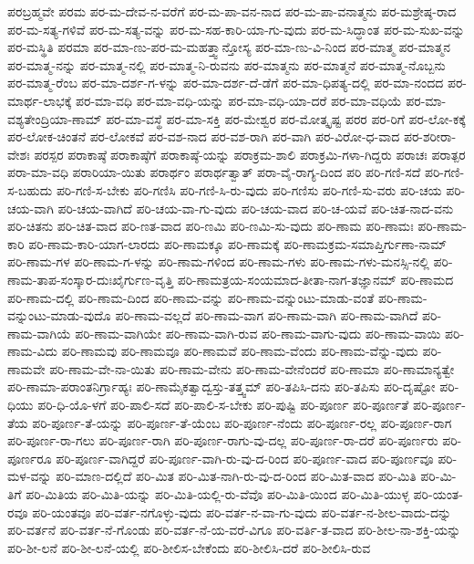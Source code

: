 {ಪರಬ್ರಹ್ಮವೇ
ಪರಮ
ಪರ-ಮ-ದೇವ-ನ-ವರೆಗೆ
ಪರ-ಮ-ಪಾ-ವನ-ನಾದ
ಪರ-ಮ-ಪಾ-ವನಾತ್ಮನು
ಪರ-ಮಶ್ರೇಷ್ಠ-ರಾದ
ಪರ-ಮ-ಸತ್ಯ-ಗಳಿವೆ
ಪರ-ಮ-ಸತ್ಯ-ವನ್ನು
ಪರ-ಮ-ಸಹ-ಕಾರಿ-ಯಾ-ಗು-ವುದು
ಪರ-ಮ-ಸಿದ್ಧಾಂತ
ಪರ-ಮ-ಸುಖ-ವನ್ನು
ಪರ-ಮಸ್ಥಿತಿ
ಪರಮಾ
ಪರ-ಮಾ-ಣು-ಪರ-ಮ-ಮಹತ್ತ್ವಾನ್ತೋಸ್ಯ
ಪರ-ಮಾ-ಣು-ವಿ-ನಿಂದ
ಪರ-ಮಾತ್ಮ
ಪರ-ಮಾತ್ಮನ
ಪರ-ಮಾತ್ಮ-ನನ್ನು
ಪರ-ಮಾತ್ಮ-ನಲ್ಲಿ
ಪರ-ಮಾತ್ಮ-ನಿ-ರುವನು
ಪರ-ಮಾತ್ಮನು
ಪರ-ಮಾತ್ಮನೆ
ಪರ-ಮಾತ್ಮ-ನೊಬ್ಬನು
ಪರ-ಮಾತ್ಮ-ರೆಂಬ
ಪರ-ಮಾ-ದರ್ಶ-ಗ-ಳನ್ನು
ಪರ-ಮಾ-ದರ್ಶ-ದೆ-ಡೆಗೆ
ಪರ-ಮಾ-ಧಿಪತ್ಯ-ದಲ್ಲಿ
ಪರ-ಮಾ-ನಂದದ
ಪರ-ಮಾರ್ಥ-ಲಾಭಕ್ಕೆ
ಪರ-ಮಾ-ವಧಿ
ಪರ-ಮಾ-ವಧಿ-ಯನ್ನು
ಪರ-ಮಾ-ವಧಿ-ಯಾ-ದರೆ
ಪರ-ಮಾ-ವಧಿಯೆ
ಪರ-ಮಾ-ವಶ್ಯತೇಂದ್ರಿಯಾ-ಣಾಮ್
ಪರ-ಮಾ-ವಸ್ಥೆ
ಪರ-ಮಾ-ಸಕ್ತಿ
ಪರ-ಮೇಶ್ವರ
ಪರ-ಮೋತ್ಕೃಷ್ಟ
ಪರರ
ಪರ-ರಿಗೆ
ಪರ-ಲೋ-ಕಕ್ಕೆ
ಪರ-ಲೋಕ-ಚಿಂತನೆ
ಪರ-ಲೋಕವೆ
ಪರ-ವಶ-ನಾದ
ಪರ-ವಶ-ರಾಗಿ
ಪರ-ವಾಗಿ
ಪರ-ವಿರೋ-ಧ-ವಾದ
ಪರ-ಶರೀರಾ-ವೇಶಃ
ಪರಸ್ಪರ
ಪರಾಕಾಷ್ಠೆ
ಪರಾಕಾಷ್ಠೆಗೆ
ಪರಾಕಾಷ್ಠೆ-ಯನ್ನು
ಪರಾಕ್ರಮ-ಶಾಲಿ
ಪರಾಕ್ರಮಿ-ಗಳಾ-ಗಿದ್ದರು
ಪರಾಚಃ
ಪರಾತ್ಪರ
ಪರಾ-ಮಾ-ವಧಿ
ಪರಾರಿಯಾ-ಯಿತು
ಪರಾರ್ಥಂ
ಪರಾರ್ಥತ್ವಾತ್
ಪರಾ-ವೈ-ರಾಗ್ಯ-ದಿಂದ
ಪರಿ
ಪರಿ-ಗಣಿ-ಸದೆ
ಪರಿ-ಗಣಿ-ಸ-ಬಹುದು
ಪರಿ-ಗಣಿ-ಸ-ಬೇಕು
ಪರಿ-ಗಣಿಸಿ
ಪರಿ-ಗಣಿ-ಸಿ-ರು-ವುದು
ಪರಿ-ಗಣಿಸು
ಪರಿ-ಗಣಿ-ಸು-ವರು
ಪರಿ-ಚಯ
ಪರಿ-ಚಯ-ವಾಗಿ
ಪರಿ-ಚಯ-ವಾಗಿದೆ
ಪರಿ-ಚಯ-ವಾ-ಗು-ವುದು
ಪರಿ-ಚಯ-ವಾದ
ಪರಿ-ಚ-ಯವೆ
ಪರಿ-ಚಿತ-ನಾದ-ವನು
ಪರಿ-ಚಿತನು
ಪರಿ-ಚಿತ-ವಾದ
ಪರಿ-ಣತ-ವಾದ
ಪರಿ-ಣಮಿ
ಪರಿ-ಣಮಿ-ಸು-ವುದು
ಪರಿ-ಣಾಮ
ಪರಿ-ಣಾಮಃ
ಪರಿ-ಣಾಮ-ಕಾರಿ
ಪರಿ-ಣಾಮ-ಕಾರಿ-ಯಾಗ-ಲಾರದು
ಪರಿ-ಣಾಮಕ್ಕೂ
ಪರಿ-ಣಾಮಕ್ಕೆ
ಪರಿ-ಣಾಮಕ್ರಮ-ಸಮಾಪ್ತಿರ್ಗುಣಾ-ನಾಮ್
ಪರಿ-ಣಾಮ-ಗಳ
ಪರಿ-ಣಾಮ-ಗ-ಳನ್ನು
ಪರಿ-ಣಾಮ-ಗಳಿಂದ
ಪರಿ-ಣಾಮ-ಗಳು
ಪರಿ-ಣಾಮ-ಗಳು-ಮನಸ್ಸಿ-ನಲ್ಲಿ
ಪರಿ-ಣಾಮ-ತಾಪ-ಸಂಸ್ಕಾರ-ದುಃಖೈರ್ಗುಣ-ವೃತ್ತಿ
ಪರಿ-ಣಾಮತ್ರಯ-ಸಂಯಮಾದ-ತೀತಾ-ನಾಗ-ತಜ್ಞಾನಮ್
ಪರಿ-ಣಾಮದ
ಪರಿ-ಣಾಮ-ದಲ್ಲಿ
ಪರಿ-ಣಾಮ-ದಿಂದ
ಪರಿ-ಣಾಮ-ವನ್ನು
ಪರಿ-ಣಾಮ-ವನ್ನುಂಟು-ಮಾಡು-ವಂತೆ
ಪರಿ-ಣಾಮ-ವನ್ನುಂಟು-ಮಾಡು-ವುದೊ
ಪರಿ-ಣಾಮ-ವಲ್ಲದೆ
ಪರಿ-ಣಾಮ-ವಾಗ
ಪರಿ-ಣಾಮ-ವಾಗಿ
ಪರಿ-ಣಾಮ-ವಾಗಿದೆ
ಪರಿ-ಣಾಮ-ವಾಗಿಯೆ
ಪರಿ-ಣಾಮ-ವಾಗಿಯೇ
ಪರಿ-ಣಾಮ-ವಾಗಿ-ರುವ
ಪರಿ-ಣಾಮ-ವಾಗು-ವುದು
ಪರಿ-ಣಾಮ-ವಾಯಿ
ಪರಿ-ಣಾಮ-ವಿದು
ಪರಿ-ಣಾಮವು
ಪರಿ-ಣಾಮವೂ
ಪರಿ-ಣಾಮವೆ
ಪರಿ-ಣಾಮ-ವೆಂದು
ಪರಿ-ಣಾಮ-ವೆನ್ನು-ವುದು
ಪರಿ-ಣಾಮವೇ
ಪರಿ-ಣಾಮ-ವೇ-ನಾ-ಯಿತು
ಪರಿ-ಣಾಮ-ವೇನು
ಪರಿ-ಣಾಮ-ವೇನೆಂದರೆ
ಪರಿ-ಣಾಮಾ
ಪರಿ-ಣಾಮಾನ್ಯತ್ವೇ
ಪರಿ-ಣಾಮಾ-ಪರಾಂತನಿರ್ಗ್ರಾಹ್ಯಃ
ಪರಿ-ಣಾಮೈಕತ್ವಾದ್ವಸ್ತು-ತತ್ತ್ವಮ್
ಪರಿ-ತಪಿಸಿ-ದನು
ಪರಿ-ತಪಿಸು
ಪರಿ-ದೃಷ್ಟೋ
ಪರಿ-ಧಿಯು
ಪರಿ-ಧಿ-ಯೊ-ಳಗೆ
ಪರಿ-ಪಾಲಿ-ಸದೆ
ಪರಿ-ಪಾಲಿ-ಸ-ಬೇಕು
ಪರಿ-ಪುಷ್ಟಿ
ಪರಿ-ಪೂರ್ಣ
ಪರಿ-ಪೂರ್ಣತೆ
ಪರಿ-ಪೂರ್ಣ-ತೆಯ
ಪರಿ-ಪೂರ್ಣ-ತೆ-ಯನ್ನು
ಪರಿ-ಪೂರ್ಣ-ತೆ-ಯೆಂಬ
ಪರಿ-ಪೂರ್ಣ-ನೆಂದು
ಪರಿ-ಪೂರ್ಣ-ರಲ್ಲ
ಪರಿ-ಪೂರ್ಣ-ರಾಗ
ಪರಿ-ಪೂರ್ಣ-ರಾ-ಗಲು
ಪರಿ-ಪೂರ್ಣ-ರಾಗಿ
ಪರಿ-ಪೂರ್ಣ-ರಾಗು-ವು-ದಲ್ಲ
ಪರಿ-ಪೂರ್ಣ-ರಾ-ದರೆ
ಪರಿ-ಪೂರ್ಣರು
ಪರಿ-ಪೂರ್ಣರೂ
ಪರಿ-ಪೂರ್ಣ-ವಾಗಿದ್ದರೆ
ಪರಿ-ಪೂರ್ಣ-ವಾಗಿ-ರು-ವು-ದ-ರಿಂದ
ಪರಿ-ಪೂರ್ಣ-ವಾದ
ಪರಿ-ಪೂರ್ಣವೂ
ಪರಿ-ಮಳ-ವನ್ನು
ಪರಿ-ಮಾಣ-ದಲ್ಲಿದೆ
ಪರಿ-ಮಿತ
ಪರಿ-ಮಿತ-ನಾಗಿ-ರು-ವು-ದ-ರಿಂದ
ಪರಿ-ಮಿತ-ವಾದ
ಪರಿ-ಮಿತಿ
ಪರಿ-ಮಿ-ತಿಗೆ
ಪರಿ-ಮಿತಿಯ
ಪರಿ-ಮಿತಿ-ಯನ್ನು
ಪರಿ-ಮಿತಿ-ಯಲ್ಲಿ-ರು-ವೆವೊ
ಪರಿ-ಮಿತಿ-ಯಿಂದ
ಪರಿ-ಮಿತಿ-ಯುಳ್ಳ
ಪರಿ-ಯಂತ-ರವೂ
ಪರಿ-ಯಂತವೂ
ಪರಿ-ವರ್ತ-ನಗೊಳ್ಳು-ವುದು
ಪರಿ-ವರ್ತ-ನ-ವಾ-ಗು-ವುದು
ಪರಿ-ವರ್ತ-ನ-ಶೀಲ-ವಾದು-ದನ್ನು
ಪರಿ-ವರ್ತನೆ
ಪರಿ-ವರ್ತ-ನೆ-ಗೊಂಡು
ಪರಿ-ವರ್ತ-ನೆ-ಯ-ವರೆ-ವಿಗೂ
ಪರಿ-ವರ್ತಿ-ತ-ವಾದ
ಪರಿ-ಶೀಲ-ನಾ-ಶಕ್ತಿ-ಯನ್ನು
ಪರಿ-ಶೀ-ಲನೆ
ಪರಿ-ಶೀ-ಲನೆ-ಯಲ್ಲಿ
ಪರಿ-ಶೀಲಿಸ-ಬೇಕೆಂದು
ಪರಿ-ಶೀಲಿಸಿ-ದರೆ
ಪರಿ-ಶೀಲಿಸಿ-ರುವ
}
